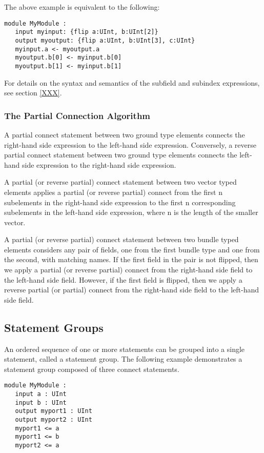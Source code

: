\documentclass[12pt]{article}
\begin{document}
The above example is equivalent to the following:
\begin{verbatim}
module MyModule :
   input myinput: {flip a:UInt, b:UInt[2]}
   output myoutput: {flip a:UInt, b:UInt[3], c:UInt}
   myinput.a <- myoutput.a
   myoutput.b[0] <- myinput.b[0]
   myoutput.b[1] <- myinput.b[1]
\end{verbatim}
For details on the syntax and semantics of the subfield and subindex expressions, see section \ref{XXX}.

\subsubsection{The Partial Connection Algorithm}

A partial connect statement between two ground type elements connects the right-hand side expression to the left-hand side expression. Conversely, a reverse partial connect statement between two ground type elements connects the left-hand side expression to the right-hand side expression. 

A partial (or reverse partial) connect statement between two vector typed elements applies a partial (or reverse partial) connect from the first n subelements in the right-hand side expression to the first n corresponding subelements in the left-hand side expression, where n is the length of the smaller vector. 

A partial (or reverse partial) connect statement between two bundle typed elements considers any pair of fields, one from the first bundle type and one from the second, with matching names. If the first field in the pair is not flipped, then we apply a partial (or reverse partial) connect from the right-hand side field to the left-hand side field. However, if the first field is flipped, then we apply a reverse partial (or partial) connect from the right-hand side field to the left-hand side field. 

\subsection{Statement Groups}

An ordered sequence of one or more statements can be grouped into a single statement, called a statement group. The following example demonstrates a statement group composed of three connect statements.

\begin{verbatim}
module MyModule :
   input a : UInt
   input b : UInt
   output myport1 : UInt
   output myport2 : UInt
   myport1 <= a
   myport1 <= b
   myport2 <= a
\end{verbatim}
\end{document}
